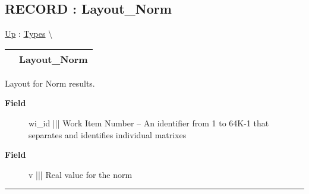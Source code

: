 \subsection*{RECORD : Layout\_Norm}
\hypertarget{ecldoc:pbblas.types.layout_norm}{}
\hyperlink{ecldoc:PBblas.Types}{Up} :
\hspace{0pt} \hyperlink{ecldoc:PBblas.Types}{Types} \textbackslash 

{\renewcommand{\arraystretch}{1.5}
\begin{tabularx}{\textwidth}{|>{\raggedright\arraybackslash}l|X|}
\hline
\hspace{0pt} & Layout\_Norm \\
\hline
\end{tabularx}
}

\par
Layout for Norm results.

\par
\begin{description}
\item [\textbf{Field}] wi\_id ||| Work Item Number -- An identifier from 1 to 64K-1 that separates and identifies individual matrixes
\item [\textbf{Field}] v ||| Real value for the norm
\end{description}

\rule{\linewidth}{0.5pt}


